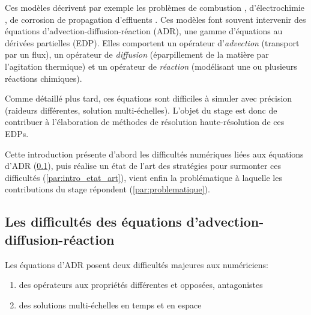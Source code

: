 Ces modèles décrivent par exemple les problèmes de combustion \cite{Law2006,Echekki2009}, d'électrochimie \cite{Munteanu2024SPM}, de corrosion \cite{AliasgharMamaghani2025}
de propagation d'effluents \cite{exemple_effluent}.
Ces modèles font souvent intervenir des équations d'advection-diffusion-réaction (ADR), 
une gamme d'équations au dérivées partielles (EDP).
Elles comportent un opérateur d'\emph{advection} (transport par un flux), un opérateur de \emph{diffusion} (éparpillement de la matière par l'agitation thermique) 
et un opérateur de \emph{réaction} (modélisant une ou plusieurs réactions chimiques).\par 
Comme détaillé plus tard, ces équations sont difficiles à simuler avec précision (raideurs différentes, solution multi-échelles). L'objet du stage est donc de contribuer à l'élaboration
de méthodes de résolution haute-résolution de ces EDPs.\par 
Cette introduction présente d'abord les difficultés numériques liées aux équations d'ADR (\ref{par:difficulte_adr}), puis réalise un état de l'art des stratégies pour surmonter ces difficultés (\ref{par:intro_etat_art}),
vient enfin la problématique à laquelle les contributions du stage répondent (\ref{par:problematique}).

\subsection{Les difficultés des équations d'advection-diffusion-réaction}
    \label{par:difficulte_adr}
    Les équations d'ADR posent deux difficultés majeures aux numériciens:
    \begin{enumerate}[label=\Alph*.]
        \item des opérateurs aux propriétés différentes et opposées, antagonistes
        \item des solutions multi-échelles en temps et en espace
    \end{enumerate}
